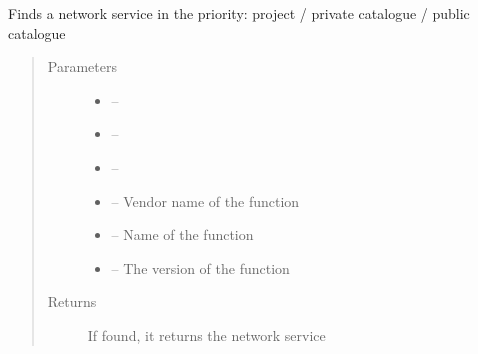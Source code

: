 \documentclass[letterpaper,10pt,english]{sphinxmanual}
\begin{document}
\begin{fulllineitems}
\label{_source/son_editor.impl:son_editor.impl.nsfslookupimpl.find_network_service}
Finds a network service in the priority: project / private catalogue / public catalogue
\begin{quote}\begin{description}
\item[{Parameters}] \leavevmode\begin{itemize}
\item {} 
 -- 

\item {} 
 -- 

\item {} 
 -- 

\item {} 
 -- Vendor name of the function

\item {} 
 -- Name of the function

\item {} 
 -- The   version of the function

\end{itemize}

\item[{Returns}] \leavevmode
If found, it returns the network service

\end{description}\end{quote}

\end{fulllineitems}

\end{document}
